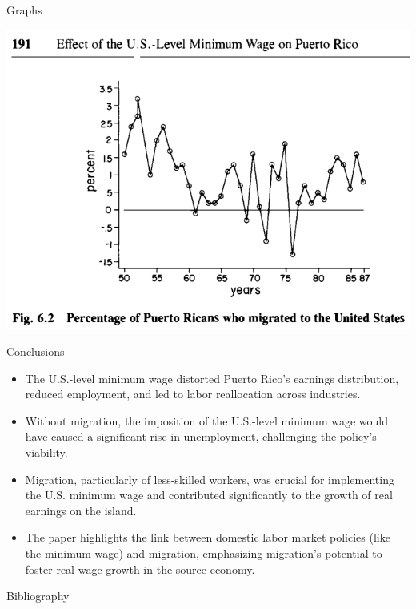 \documentclass[12pt]{beamer}
\begin{document}
\begin{frame}[allowframebreaks]{Graphs}
	\begin{center}
		\includegraphics[width=0.8\linewidth]{assets/graph.png}
	\end{center}
\end{frame}

\begin{frame}[allowframebreaks]{Conclusions}
	\begin{itemize}
		\item The U.S.-level minimum wage distorted Puerto Rico's earnings distribution, reduced employment, and led to labor reallocation across industries.
		\item Without migration, the imposition of the U.S.-level minimum wage would have caused a significant rise in unemployment, challenging the policy's viability.
		\item Migration, particularly of less-skilled workers, was crucial for implementing the U.S. minimum wage and contributed significantly to the growth of real earnings on the island.
		\item The paper highlights the link between domestic labor market policies (like the minimum wage) and migration, emphasizing migration's potential to foster real wage growth in the source economy.
	\end{itemize}
\end{frame}
\begin{frame}[allowframebreaks]{Bibliography}
	\printbibliography
\end{frame}
\end{document}
